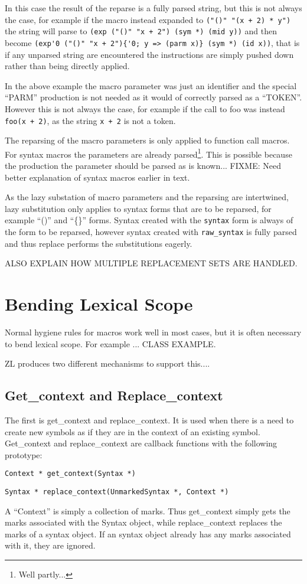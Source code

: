 \documentclass[12pt,english,letterpaper]{article}
\begin{document}
In this case the result of the reparse is a fully parsed string, but
this is not always the case, for example if the macro instead expanded
to \verb/("()" "(x + 2) * y")/ the string will parse to
\verb/(exp ("()" "x + 2") (sym *) (mid y))/ and then become
\verb/(exp'0 ("()" "x + 2"){'0; y => (parm x)} (sym *) (id x))/, that
is if any unparsed string are encountered the instructions are simply
pushed down rather than being directly applied.

In the above example the macro parameter was just an identifier and the
special ``PARM'' production is not needed as it would of correctly
parsed as a ``TOKEN''.  However this is not always the case, for
example if the call to foo was instead \verb/foo(x + 2)/, as the
string \verb/x + 2/ is not a token.

The reparsing of the macro parameters is only applied to function call
macros.  For syntax macros the parameters are already
parsed\footnote{Well partly...}.  This is possible because the
production the parameter should be parsed as is known... FIXME: Need
better explanation of syntax macros earlier in text.

As the lazy substation of macro parameters and the reparsing are
intertwined, lazy substitution only applies to syntax forms that are to
be reparsed, for example ``()'' and ``\{\}'' forms.  Syntax created
with the \verb/syntax/ form is always of the form to be reparsed,
however syntax created with \verb/raw_syntax/ is fully parsed and thus
replace performs the substitutions eagerly.

ALSO EXPLAIN HOW MULTIPLE REPLACEMENT SETS ARE HANDLED.

\section{Bending Lexical Scope}

Normal hygiene rules for macros work well in most cases, but it is
often necessary to bend lexical scope.  For example ... CLASS EXAMPLE.

ZL produces two different mechanisms to support this....

\subsection{Get\_context and Replace\_context}
\label{replace_context}

The first is get\_context and replace\_context.  It is used when there
is a need to create new symbols as if they are in the context of an
existing symbol.  Get\_context and replace\_context are callback
functions with the following prototype:
\begin{itemize*}
\item \verb/Context * get_context(Syntax *)/
\item \verb/Syntax * replace_context(UnmarkedSyntax *, Context *)/
\end{itemize*}
A ``Context'' is simply a collection of marks.  Thus get\_context
simply gets the marks associated with the Syntax object, while
replace\_context replaces the marks of a syntax object.  If an syntax
object already has any marks associated with it, they are ignored.
\end{document}
